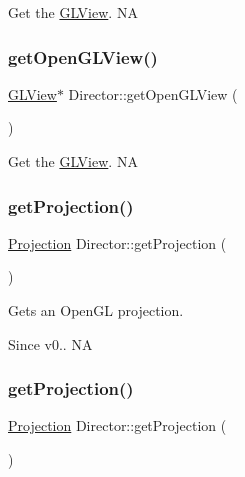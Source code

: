 Get the \hyperlink{classGLView}{G\+L\+View}.  NA \mbox{\label{classDirector_a9480a6fa03967568e72b392e2b53c599}} 
\subsubsection{\texorpdfstring{get\+Open\+G\+L\+View()}{getOpenGLView()}\hspace{0.1cm}{\footnotesize\ttfamily [2/2]}}
{\footnotesize\ttfamily \hyperlink{classGLView}{G\+L\+View}$\ast$ Director\+::get\+Open\+G\+L\+View (\begin{DoxyParamCaption}{ }\end{DoxyParamCaption})\hspace{0.3cm}{\ttfamily [inline]}}

Get the \hyperlink{classGLView}{G\+L\+View}.  NA \mbox{\label{classDirector_a36e916d304e26fb6861b497806dc9980}} 
\subsubsection{\texorpdfstring{get\+Projection()}{getProjection()}\hspace{0.1cm}{\footnotesize\ttfamily [1/2]}}
{\footnotesize\ttfamily \hyperlink{classDirector_aaa3d9a0eac7c805d87ecba67c974fcf2}{Projection} Director\+::get\+Projection (\begin{DoxyParamCaption}{ }\end{DoxyParamCaption})\hspace{0.3cm}{\ttfamily [inline]}}

Gets an Open\+GL projection. \begin{DoxySince}{Since}
v0..  NA 
\end{DoxySince}
\mbox{\label{classDirector_a36e916d304e26fb6861b497806dc9980}} 
\subsubsection{\texorpdfstring{get\+Projection()}{getProjection()}\hspace{0.1cm}{\footnotesize\ttfamily [2/2]}}
{\footnotesize\ttfamily \hyperlink{classDirector_aaa3d9a0eac7c805d87ecba67c974fcf2}{Projection} Director\+::get\+Projection (\begin{DoxyParamCaption}{ }\end{DoxyParamCaption})\hspace{0.3cm}{\ttfamily [inline]}}

